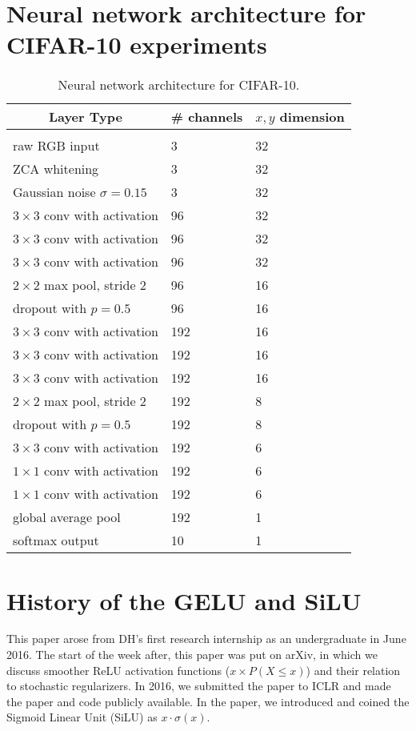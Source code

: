 \documentclass{article}
\begin{document}
\section{Neural network architecture for CIFAR-10 experiments}
\label{appendixb}
\begin{table}[H]
\caption{Neural network architecture for CIFAR-10.}
\label{sample-table}
\begin{center}
\begin{tabular}{lll}
\multicolumn{1}{c}{\bf Layer Type}  &\multicolumn{1}{c}{\bf \# channels}  &\multicolumn{1}{c}{\bf $x,y$ dimension}
\\ \hline \\
raw RGB input         &3	&32\\
ZCA whitening         &3	&32\\
Gaussian noise $\sigma=0.15$         &3	&32\\
$3\times 3$ conv with activation         &96	&32\\
$3\times 3$ conv with activation         &96	&32\\
$3\times 3$ conv with activation         &96	&32\\
$2\times 2$ max pool, stride 2         &96	&16\\
dropout with $p=0.5$         &96	&16\\
$3\times 3$ conv with activation         &192	&16\\
$3\times 3$ conv with activation         &192	&16\\
$3\times 3$ conv with activation         &192	&16\\
$2\times 2$ max pool, stride 2         &192	&8\\
dropout with $p=0.5$         &192	&8\\
$3\times 3$ conv with activation         &192	&6\\
$1\times 1$ conv with activation         &192	&6\\
$1\times 1$ conv with activation         &192	&6\\
global average pool         			 &192	&1\\
softmax output		         			 &10	&1\\

\end{tabular}\label{tab:c10architecture}
\end{center}
\end{table}

\section{History of the GELU and SiLU}
This paper arose from DH’s first research internship as an undergraduate in June 2016. The start of the week after, this paper was put on arXiv, in which we discuss smoother ReLU activation functions ($x\times P(X\le x)$) and their relation to stochastic regularizers. In 2016, we submitted the paper to ICLR and made the paper and code publicly available. In the paper, we introduced and coined the Sigmoid Linear Unit (SiLU) as $x\cdot \sigma(x)$.
\end{document}
